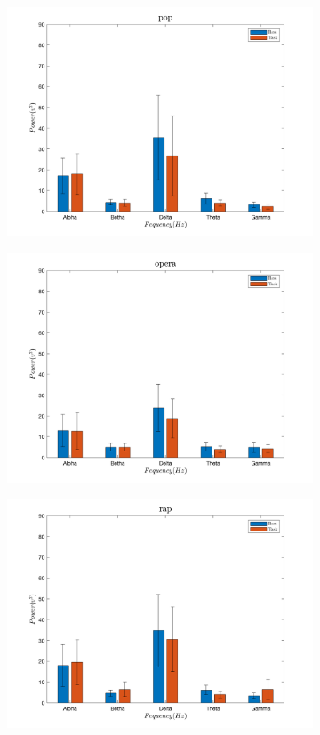 \documentclass[9pt,twocolumn]{paper-template}
\begin{document}
\begin{figure}[!htbp]
\begin{subfigure}[b]{0.4\linewidth}
    \includegraphics[width=\linewidth]{figures/pop_RT.png}
  \end{subfigure}
   \begin{subfigure}[b]{0.4\linewidth}
    \includegraphics[width=\linewidth]{figures/opera_RT.png}
  \end{subfigure}
   \begin{subfigure}[b]{0.4\linewidth}
    \includegraphics[width=\linewidth]{figures/rap_RT.png}
    

\end{subfigure}
\end{figure}
\end{document}
